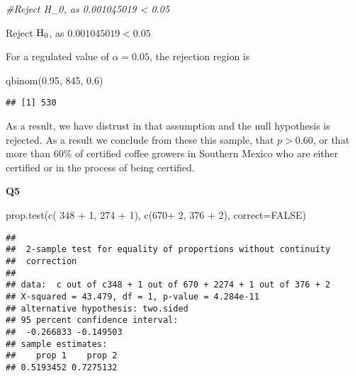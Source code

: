 \documentclass[
]{article}
\newenvironment{Shaded}{\begin{snugshade}}{\end{snugshade}}
\newcommand{\AttributeTok}[1]{\textcolor[rgb]{0.77,0.63,0.00}{#1}}
\newcommand{\CommentTok}[1]{\textcolor[rgb]{0.56,0.35,0.01}{\textit{#1}}}
\newcommand{\ConstantTok}[1]{\textcolor[rgb]{0.00,0.00,0.00}{#1}}
\newcommand{\DecValTok}[1]{\textcolor[rgb]{0.00,0.00,0.81}{#1}}
\newcommand{\FloatTok}[1]{\textcolor[rgb]{0.00,0.00,0.81}{#1}}
\newcommand{\FunctionTok}[1]{\textcolor[rgb]{0.00,0.00,0.00}{#1}}
\newcommand{\NormalTok}[1]{#1}
\newcommand{\SpecialCharTok}[1]{\textcolor[rgb]{0.00,0.00,0.00}{#1}}
\begin{document}
\begin{Shaded}
\begin{Highlighting}[]
\CommentTok{\#Reject H\_0, as 0.001045019 \textless{} 0.05}
\end{Highlighting}
\end{Shaded}

Reject \({\rm H}_{0}\), as \(0.001045019 < 0.05\)

For a regulated value of \(\alpha = 0.05\), the rejection region is

\begin{Shaded}
\begin{Highlighting}[]
\FunctionTok{qbinom}\NormalTok{(}\FloatTok{0.95}\NormalTok{, }\DecValTok{845}\NormalTok{, }\FloatTok{0.6}\NormalTok{)}
\end{Highlighting}
\end{Shaded}

\begin{verbatim}
## [1] 530
\end{verbatim}

As a result, we have distrust in that assumption and the null hypothesis
is rejected. As a result we conclude from these this sample, that
\(p > 0.60\), or that more than 60\% of certified coffee growers in
Southern Mexico who are either certified or in the process of being
certified.

\textbf{Q5}

\begin{Shaded}
\begin{Highlighting}[]
\FunctionTok{prop.test}\NormalTok{(}\FunctionTok{c}\NormalTok{( }\DecValTok{348} \SpecialCharTok{+} \DecValTok{1}\NormalTok{, }\DecValTok{274} \SpecialCharTok{+} \DecValTok{1}\NormalTok{), }\FunctionTok{c}\NormalTok{(}\DecValTok{670}\SpecialCharTok{+} \DecValTok{2}\NormalTok{, }\DecValTok{376} \SpecialCharTok{+} \DecValTok{2}\NormalTok{), }\AttributeTok{correct=}\ConstantTok{FALSE}\NormalTok{)}
\end{Highlighting}
\end{Shaded}

\begin{verbatim}
## 
##  2-sample test for equality of proportions without continuity
##  correction
## 
## data:  c out of c348 + 1 out of 670 + 2274 + 1 out of 376 + 2
## X-squared = 43.479, df = 1, p-value = 4.284e-11
## alternative hypothesis: two.sided
## 95 percent confidence interval:
##  -0.266833 -0.149503
## sample estimates:
##    prop 1    prop 2 
## 0.5193452 0.7275132
\end{verbatim}
\end{document}
